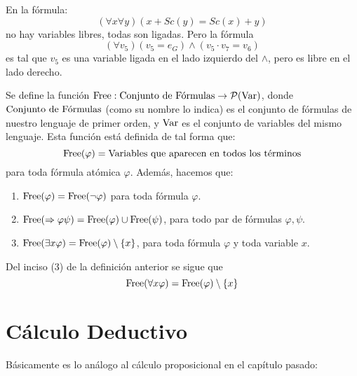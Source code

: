 \documentclass[12pt]{report}
\theoremstyle{largebreak}
\newcommand\cf[3]{\ensuremath{#1:#2\rightarrow#3}}
\newcommand{\free}{\textup{Free}}
\begin{document}
    En la fórmula:
    \begin{equation*}
        (\forall x\forall y)(x+Sc(y)=Sc(x)+y)
    \end{equation*}
    no hay variables libres, todas son ligadas. Pero la fórmula
    \begin{equation*}
        (\forall v_5)(v_5=e_G)\land(v_5\cdot v_7=v_6)
    \end{equation*}
    es tal que $v_5$ es una variable ligada en el lado izquierdo del $\land$, pero es libre en el lado derecho.

    \begin{mydef}
        Se define la función $\cf{\free}{\textup{Conjunto de Fórmulas}}{\mathcal{P}(\textup{Var})}$, donde $\textup{Conjunto de Fórmulas}$ (como su nombre lo indica) es el conjunto de fórmulas de nuestro lenguaje de primer orden, y $\textup{Var}$ es el conjunto de variables del mismo lenguaje. Esta función está definida de tal forma que:
        \begin{equation*}
            \free(\varphi)=\textup{Variables que aparecen en todos los términos}
        \end{equation*}
        para toda fórmula atómica $\varphi$. Además, hacemos que:
        \begin{enumerate}
            \item $\free(\varphi)=\free(\neg\varphi)$ para toda fórmula $\varphi$.
            \item $\free(\Rightarrow\varphi\psi)=\free(\varphi)\cup\free(\psi)$, para todo par de fórmulas $\varphi,\psi$.
            \item $\free(\exists x\varphi)=\free(\varphi)\setminus\left\{x\right\}$, para toda fórmula $\varphi$ y toda variable $x$.
        \end{enumerate}
    \end{mydef}

    \begin{obs}
        Del inciso (3) de la definición anterior se sigue que
        \begin{equation*}
            \free(\forall x\varphi)=\free(\varphi)\setminus\left\{x\right\}
        \end{equation*}
    \end{obs}

    \section{Cálculo Deductivo}

    Básicamente es lo análogo al cálculo proposicional en el capítulo pasado:
\end{document}
